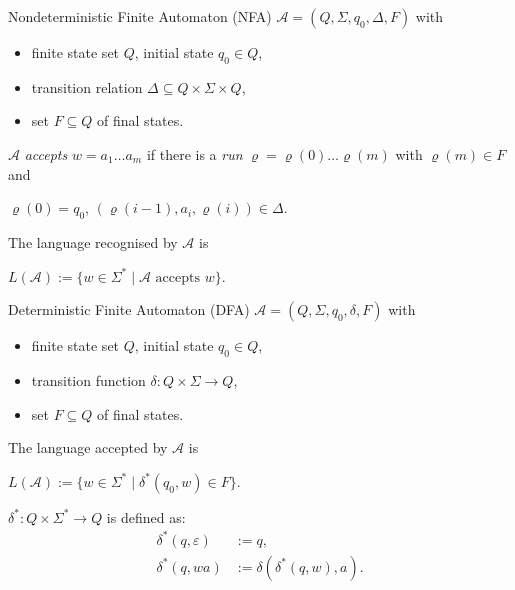 \documentclass[english]{panikzettel}
\begin{document}
\begin{halfboxl}
    \vspace{-\baselineskip}
    \begin{defi}{Nondeterministic Finite Automaton (NFA)}
        $\mathcal{A}=(Q,\Sigma,q_0,\Delta,F)$ with
        \begin{itemize}
            \item finite state set $Q$, initial state $q_0 \in Q$,
            \item transition relation $\Delta \subseteq Q \times \Sigma \times Q$,
            \item set $F \subseteq Q$ of final states.
        \end{itemize}

        $\mathcal{A}$ \emph{accepts} $w=a_1 \dots a_m$ if there is a \emph{run} $\varrho=\varrho(0) \dots \varrho(m)$ with $\varrho(m) \in F$ and
        \begin{tightcenter}
            $\varrho(0)=q_0$, $(\varrho(i-1),a_i,\varrho(i)) \in \Delta$.
        \end{tightcenter}

        The language recognised by $\mathcal{A}$ is
        \begin{tightcenter}
            $L(\mathcal{A}):=\{w \in \Sigma^* \mid \mathcal{A} \text{ accepts } w\}$.
        \end{tightcenter}
    \end{defi}
\end{halfboxl}%
\begin{halfboxr}
    \vspace{-\baselineskip}

    \begin{defi}{Deterministic Finite Automaton (DFA)}
        $\mathcal{A}=(Q,\Sigma,q_0,\delta,F)$ with
        \begin{itemize}
            \item finite state set $Q$, initial state $q_0 \in Q$,
            \item transition function $\delta : Q \times \Sigma \rightarrow Q$,
            \item set $F \subseteq Q$ of final states.
        \end{itemize}

        The language accepted by $\mathcal{A}$ is
        \begin{tightcenter}
            $L(\mathcal{A}):=\{w \in \Sigma^* \mid \delta^*(q_0,w) \in F \}$.
        \end{tightcenter}
        $\delta^* : Q \times \Sigma^* \rightarrow Q$ is defined as:
        \vspace{-\baselineskip}
        \begin{align*}
            \delta^*(q,\varepsilon) & := q,                       \\
            \delta^*(q,wa)          & := \delta(\delta^*(q,w),a).
        \end{align*}
    \end{defi}
\end{halfboxr}
\end{document}
